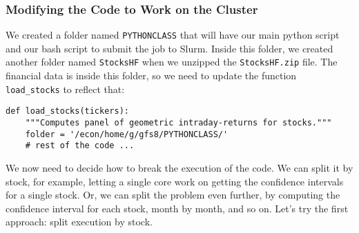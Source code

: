 \documentclass[12pt, a4paper]{article}
\begin{document}
\subsubsection{Modifying the Code to Work on the Cluster}
\label{sec:orgc11b3b9}
We created a folder named \texttt{PYTHONCLASS} that will have our main python script and our bash script to submit the job to Slurm.
Inside this folder, we created another folder named \texttt{StocksHF} when we unzipped the \texttt{StocksHF.zip} file.
The financial data is inside this folder, so we need to update the function \texttt{load\_stocks} to reflect that:
\lstset{language=jupyter-python,label= ,caption= ,captionpos=b,numbers=none}
\begin{lstlisting}
def load_stocks(tickers):
    """Computes panel of geometric intraday-returns for stocks."""
    folder = '/econ/home/g/gfs8/PYTHONCLASS/'
    # rest of the code ...
\end{lstlisting}

We now need to decide how to break the execution of the code.
We can split it by stock, for example, letting a single core work on getting the confidence intervals for a single stock.
Or, we can split the problem even further, by computing the confidence interval for each stock, month by month, and so on.
Let's try the first approach: split execution by stock.
\end{document}
